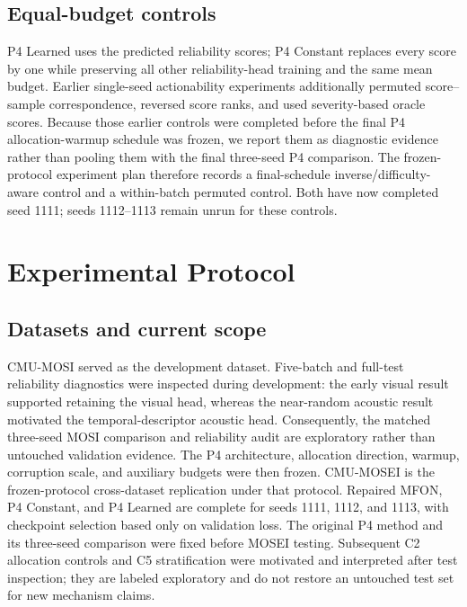 \subsection{Equal-budget controls}\label{equal-budget-controls}

P4 Learned uses the predicted reliability scores; P4 Constant replaces
every score by one while preserving all other reliability-head training
and the same mean budget. Earlier single-seed actionability experiments
additionally permuted score--sample correspondence, reversed score
ranks, and used severity-based oracle scores. Because those earlier
controls were completed before the final P4 allocation-warmup schedule
was frozen, we report them as diagnostic evidence rather than pooling
them with the final three-seed P4 comparison. The frozen-protocol experiment
plan therefore records a final-schedule inverse/difficulty-aware control
and a within-batch permuted control. Both have now completed seed 1111;
seeds 1112--1113 remain unrun for these controls.

\section{Experimental Protocol}\label{experimental-protocol}

\subsection{Datasets and current
scope}\label{datasets-and-current-scope}

CMU-MOSI \cite{zadeh2016multimodal} served as the development dataset.
Five-batch and full-test reliability diagnostics were inspected during
development: the early visual result supported retaining the visual head,
whereas the near-random acoustic result motivated the temporal-descriptor
acoustic head. Consequently, the matched three-seed MOSI comparison and
reliability audit are exploratory rather than untouched validation
evidence. The P4 architecture, allocation direction, warmup, corruption
scale, and auxiliary budgets were then frozen. CMU-MOSEI
\cite{zadeh2018mosei} is the frozen-protocol cross-dataset replication under
that protocol. Repaired MFON, P4 Constant, and P4 Learned are complete for
seeds 1111, 1112, and 1113, with checkpoint selection based only on validation
loss. The original P4 method and its three-seed comparison were fixed before
MOSEI testing. Subsequent C2 allocation controls and C5 stratification were
motivated and interpreted after test inspection; they are labeled exploratory
and do not restore an untouched test set for new mechanism claims.

